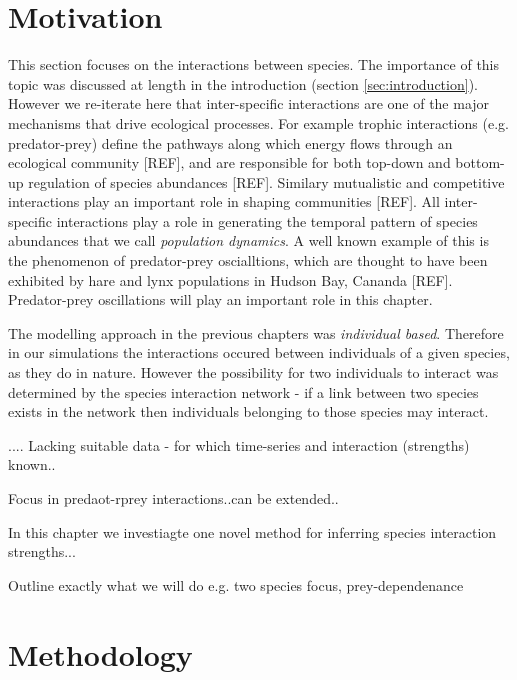  
\section{Motivation}
\label{sec:motivate_interactions}

This section focuses on the interactions between species. The importance of this topic was discussed at length in the introduction (section \ref{sec:introduction}). However we re-iterate here that inter-specific interactions are one of the major mechanisms that drive ecological processes. For example trophic interactions (e.g. predator-prey) define the pathways along which energy flows through an ecological community [REF], and are responsible for both top-down and bottom-up regulation of species abundances [REF]. Similary mutualistic and competitive interactions play an important role in shaping communities [REF]. All inter-specific interactions play a role in generating the temporal pattern of species abundances that we call \emph{population dynamics}. A well known example of this is the phenomenon of predator-prey oscialltions, which are thought to have been exhibited by hare and lynx populations in Hudson Bay, Cananda [REF]. Predator-prey oscillations will play an important role in this chapter.

The modelling approach in the previous chapters was \emph{individual based}. Therefore in our simulations the interactions occured between individuals of a given species, as they do in nature. However the possibility for two individuals to interact was determined by the species interaction network - if a link between two species exists in the network then individuals belonging to those species may interact. 

....
Lacking suitable data - for which time-series and interaction (strengths) known..

Focus in predaot-rprey interactions..can be extended..

In this chapter we investiagte one novel method for inferring species interaction strengths...

Outline exactly what we will do e.g. two species focus, prey-dependenance 

\section{Methodology}
\label{sec:methods}

